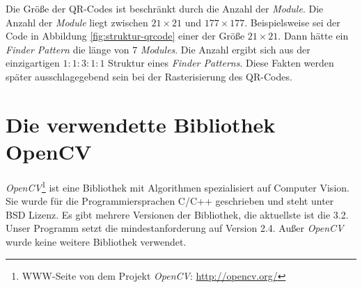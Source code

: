 Die Größe der QR-Codes ist beschränkt durch die Anzahl der \emph{Module}. Die Anzahl der \emph{Module} liegt zwischen $21 \times 21$ und $177 \times 177$. Beispielsweise sei der Code in Abbildung \ref{fig:struktur-qrcode} einer der Größe $21 \times 21$. Dann hätte ein \emph{Finder Pattern} die länge von $7$ \emph{Modules}. Die Anzahl ergibt sich aus der einzigartigen $1:1:3:1:1$ Struktur eines \emph{Finder Patterns}. Diese Fakten werden später ausschlagegebend sein bei der Rasterisierung des QR-Codes.

\section{Die verwendette Bibliothek OpenCV}
\emph{OpenCV}\footnote{WWW-Seite von dem Projekt \emph{OpenCV}: \url{http://opencv.org/}} ist eine Bibliothek mit Algorithmen spezialisiert auf \glqq Computer Vision\grqq . Sie wurde für die Programmiersprachen C/C++ geschrieben und steht unter BSD Lizenz. Es gibt mehrere Versionen der Bibliothek, die aktuellste ist die 3.2. Unser Programm setzt  die mindestanforderung auf Version 2.4. Außer \emph{OpenCV} wurde keine weitere Bibliothek verwendet. 
